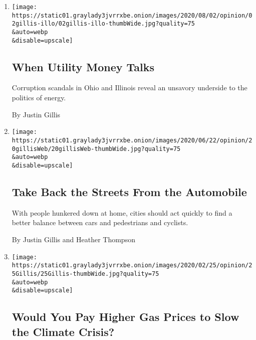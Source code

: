 \begin{enumerate}
\def\labelenumi{\arabic{enumi}.}
\item
  \href{/2020/08/02/opinion/utility-corruption-energy.html}{}

  \texttt{[image: https://static01.graylady3jvrrxbe.onion/images/2020/08/02/opinion/02gillis-illo/02gillis-illo-thumbWide.jpg?quality=75\\\&auto=webp\\\&disable=upscale]}

  \hypertarget{when-utility-money-talks}{%
  \subsection{When Utility Money Talks}\label{when-utility-money-talks}}

  Corruption scandals in Ohio and Illinois reveal an unsavory underside
  to the politics of energy.

  By Justin Gillis
\item
  \href{/2020/06/20/opinion/pandemic-automobile-cities.html}{}

  \texttt{[image: https://static01.graylady3jvrrxbe.onion/images/2020/06/22/opinion/20gillisWeb/20gillisWeb-thumbWide.jpg?quality=75\\\&auto=webp\\\&disable=upscale]}

  \hypertarget{take-back-the-streets-from-the-automobile}{%
  \subsection{Take Back the Streets From the
  Automobile}\label{take-back-the-streets-from-the-automobile}}

  With people hunkered down at home, cities should act quickly to find a
  better balance between cars and pedestrians and cyclists.

  By Justin Gillis and Heather Thompson
\item
  \href{/2020/02/26/opinion/gas-price-climate-change.html}{}

  \texttt{[image: https://static01.graylady3jvrrxbe.onion/images/2020/02/25/opinion/25Gillis/25Gillis-thumbWide.jpg?quality=75\\\&auto=webp\\\&disable=upscale]}

  \hypertarget{would-you-pay-higher-gas-prices-to-slow-the-climate-crisis}{%
  \subsection{Would You Pay Higher Gas Prices to Slow the Climate
  Crisis?}\label{would-you-pay-higher-gas-prices-to-slow-the-climate-crisis}}


\end{enumerate}
